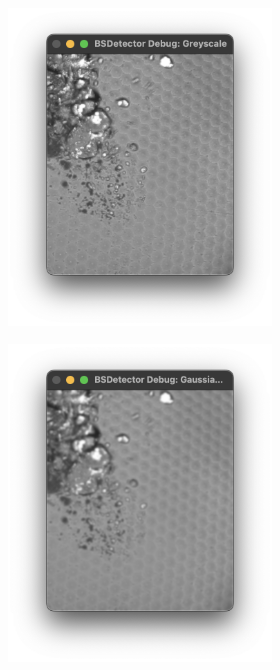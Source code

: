 \begin{figure}[H]
\begin{subfigure}{.6\textwidth}
\begin{subfigure}{0.32\textwidth}
            \includegraphics[width=1\linewidth]{assets/sys_gs.png}
            \caption{}
            \label{fig:sys_gs}
        \end{subfigure}
        \hfill
        \begin{subfigure}{0.32\textwidth}
            \centering
            \includegraphics[width=1\linewidth]{assets/sys_gb.png}

\end{subfigure}
\end{subfigure}
\end{figure}
